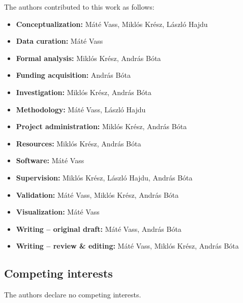 \documentclass[pdflatex,sn-mathphys-ay]{sn-jnl}
\begin{document}
The authors contributed to this work as follows:

\begin{itemize}
\setlength\itemsep{0.5em}
\item \textbf{Conceptualization:} Máté Vass, Miklós Krész, László Hajdu
\item \textbf{Data curation:} Máté Vass
\item \textbf{Formal analysis:} Miklós Krész, András Bóta
\item \textbf{Funding acquisition:} András Bóta
\item \textbf{Investigation:} Miklós Krész, András Bóta
\item \textbf{Methodology:} Máté Vass, László Hajdu
\item \textbf{Project administration:} Miklós Krész, András Bóta
\item \textbf{Resources:} Miklós Krész, András Bóta
\item \textbf{Software:} Máté Vass
\item \textbf{Supervision:} Miklós Krész, László Hajdu, András Bóta
\item \textbf{Validation:} Máté Vass, Miklós Krész, András Bóta
\item \textbf{Visualization:} Máté Vass
\item \textbf{Writing – original draft:} Máté Vass, András Bóta
\item \textbf{Writing – review \& editing:} Máté Vass, Miklós Krész, András Bóta
\end{itemize}


\subsection*{Competing interests}\label{subsec_competing}

The authors declare no competing interests.



\end{document}
